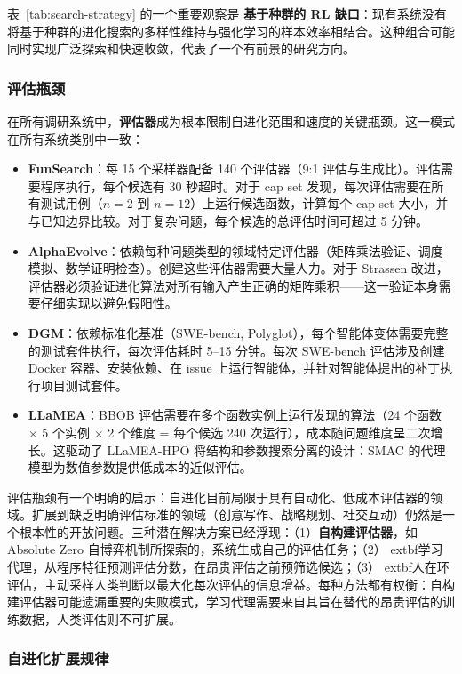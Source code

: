 表~\ref{tab:search-strategy} 的一个重要观察是 \textbf{基于种群的 RL 缺口}：现有系统没有将基于种群的进化搜索的多样性维持与强化学习的样本效率相结合。这种组合可能同时实现广泛探索和快速收敛，代表了一个有前景的研究方向。


\subsubsection{评估瓶颈}

在所有调研系统中，\textbf{评估器}成为根本限制自进化范围和速度的关键瓶颈。这一模式在所有系统类别中一致：

\begin{itemize}
    \item \textbf{FunSearch}：每 15 个采样器配备 140 个评估器（9:1 评估与生成比）。评估需要程序执行，每个候选有 30 秒超时。对于 cap set 发现，每次评估需要在所有测试用例（$n = 2$ 到 $n = 12$）上运行候选函数，计算每个 cap set 大小，并与已知边界比较。对于复杂问题，每个候选的总评估时间可超过 5 分钟。
    \item \textbf{AlphaEvolve}：依赖每种问题类型的领域特定评估器（矩阵乘法验证、调度模拟、数学证明检查）。创建这些评估器需要大量人力。对于 Strassen 改进，评估器必须验证进化算法对所有输入产生正确的矩阵乘积——这一验证本身需要仔细实现以避免假阳性。
    \item \textbf{DGM}：依赖标准化基准（SWE-bench, Polyglot），每个智能体变体需要完整的测试套件执行，每次评估耗时 5--15 分钟。每次 SWE-bench 评估涉及创建 Docker 容器、安装依赖、在 issue 上运行智能体，并针对智能体提出的补丁执行项目测试套件。
    \item \textbf{LLaMEA}：BBOB 评估需要在多个函数实例上运行发现的算法（24 个函数 $\times$ 5 个实例 $\times$ 2 个维度 = 每个候选 240 次运行），成本随问题维度呈二次增长。这驱动了 LLaMEA-HPO 将结构和参数搜索分离的设计：SMAC 的代理模型为数值参数提供低成本的近似评估。
\end{itemize}

评估瓶颈有一个明确的启示：自进化目前局限于具有自动化、低成本评估器的领域。扩展到缺乏明确评估标准的领域（创意写作、战略规划、社交互动）仍然是一个根本性的开放问题。三种潜在解决方案已经浮现：（1）\textbf{自构建评估器}，如 Absolute Zero 自博弈机制所探索的，系统生成自己的评估任务；（2）	extbf{学习代理}，从程序特征预测评估分数，在昂贵评估之前预筛选候选；（3）	extbf{人在环评估}，主动采样人类判断以最大化每次评估的信息增益。每种方法都有权衡：自构建评估器可能遗漏重要的失败模式，学习代理需要来自其旨在替代的昂贵评估的训练数据，人类评估则不可扩展。


\subsubsection{自进化扩展规律}

